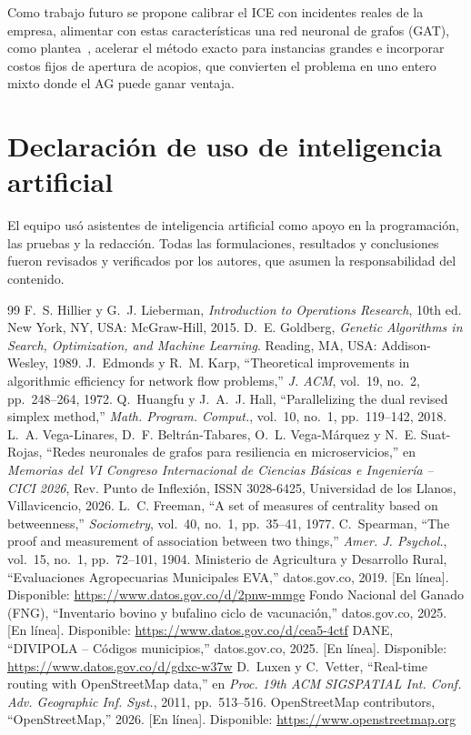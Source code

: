 \documentclass[conference]{IEEEtran}
\begin{document}
Como trabajo futuro se propone calibrar el ICE con incidentes reales de la empresa, alimentar con
estas características una red neuronal de grafos (GAT), como plantea~\cite{ice}, acelerar el método
exacto para instancias grandes e incorporar costos fijos de apertura de acopios, que convierten el
problema en uno entero mixto donde el AG puede ganar ventaja.

\section*{Declaración de uso de inteligencia artificial}
El equipo usó asistentes de inteligencia artificial como apoyo en la programación, las pruebas y la
redacción. Todas las formulaciones, resultados y conclusiones fueron revisados y verificados por los
autores, que asumen la responsabilidad del contenido.

\begin{thebibliography}{99}
 F.~S. Hillier y G.~J. Lieberman, \emph{Introduction to Operations Research}, 10th ed.
New York, NY, USA: McGraw-Hill, 2015.
 D.~E. Goldberg, \emph{Genetic Algorithms in Search, Optimization, and Machine
Learning}. Reading, MA, USA: Addison-Wesley, 1989.
 J.~Edmonds y R.~M. Karp, ``Theoretical improvements in algorithmic efficiency for
network flow problems,'' \emph{J. ACM}, vol.~19, no.~2, pp.~248--264, 1972.
 Q.~Huangfu y J.~A.~J. Hall, ``Parallelizing the dual revised simplex method,''
\emph{Math. Program. Comput.}, vol.~10, no.~1, pp.~119--142, 2018.
 L.~A. Vega-Linares, D.~F. Beltrán-Tabares, O.~L. Vega-Márquez y N.~E. Suat-Rojas,
``Redes neuronales de grafos para resiliencia en microservicios,'' en \emph{Memorias del VI Congreso
Internacional de Ciencias Básicas e Ingeniería -- CICI 2026}, Rev. Punto de Inflexión, ISSN 3028-6425,
Universidad de los Llanos, Villavicencio, 2026.
 L.~C. Freeman, ``A set of measures of centrality based on betweenness,''
\emph{Sociometry}, vol.~40, no.~1, pp.~35--41, 1977.
 C.~Spearman, ``The proof and measurement of association between two things,''
\emph{Amer. J. Psychol.}, vol.~15, no.~1, pp.~72--101, 1904.
 Ministerio de Agricultura y Desarrollo Rural, ``Evaluaciones Agropecuarias Municipales
EVA,'' datos.gov.co, 2019. [En línea]. Disponible: \url{https://www.datos.gov.co/d/2pnw-mmge}
 Fondo Nacional del Ganado (FNG), ``Inventario bovino y bufalino ciclo de vacunación,''
datos.gov.co, 2025. [En línea]. Disponible: \url{https://www.datos.gov.co/d/cea5-4ctf}
 DANE, ``DIVIPOLA -- Códigos municipios,'' datos.gov.co, 2025. [En línea].
Disponible: \url{https://www.datos.gov.co/d/gdxc-w37w}
 D.~Luxen y C.~Vetter, ``Real-time routing with OpenStreetMap data,'' en \emph{Proc.
19th ACM SIGSPATIAL Int. Conf. Adv. Geographic Inf. Syst.}, 2011, pp.~513--516.
 OpenStreetMap contributors, ``OpenStreetMap,'' 2026. [En línea]. Disponible:
\url{https://www.openstreetmap.org}
\end{thebibliography}
\end{document}

